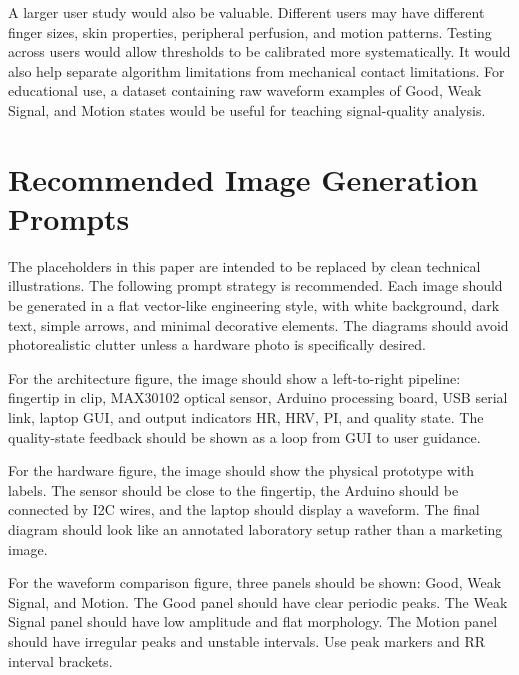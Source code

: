 \documentclass[10pt,conference]{IEEEtran}
\begin{document}
A larger user study would also be valuable. Different users may have different finger sizes, skin properties, peripheral perfusion, and motion patterns. Testing across users would allow thresholds to be calibrated more systematically. It would also help separate algorithm limitations from mechanical contact limitations. For educational use, a dataset containing raw waveform examples of Good, Weak Signal, and Motion states would be useful for teaching signal-quality analysis.

\section{Recommended Image Generation Prompts}
The placeholders in this paper are intended to be replaced by clean technical illustrations. The following prompt strategy is recommended. Each image should be generated in a flat vector-like engineering style, with white background, dark text, simple arrows, and minimal decorative elements. The diagrams should avoid photorealistic clutter unless a hardware photo is specifically desired.

For the architecture figure, the image should show a left-to-right pipeline: fingertip in clip, MAX30102 optical sensor, Arduino processing board, USB serial link, laptop GUI, and output indicators HR, HRV, PI, and quality state. The quality-state feedback should be shown as a loop from GUI to user guidance.

For the hardware figure, the image should show the physical prototype with labels. The sensor should be close to the fingertip, the Arduino should be connected by I2C wires, and the laptop should display a waveform. The final diagram should look like an annotated laboratory setup rather than a marketing image.

For the waveform comparison figure, three panels should be shown: Good, Weak Signal, and Motion. The Good panel should have clear periodic peaks. The Weak Signal panel should have low amplitude and flat morphology. The Motion panel should have irregular peaks and unstable intervals. Use peak markers and RR interval brackets.
\end{document}
